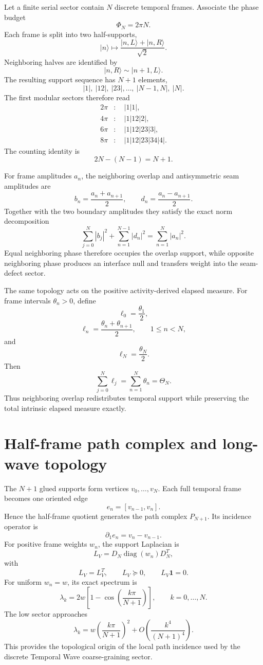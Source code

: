 \documentclass[11pt]{book}
\begin{document}
Let a finite serial sector contain $N$ discrete temporal frames. Associate the phase budget
\[
\boxed{\Phi_N=2\pi N.}
\]
Each frame is split into two half-supports,
\[
\boxed{
|n\rangle
\mapsto
\frac{|n,L\rangle+|n,R\rangle}{\sqrt2}.
}
\]
Neighboring halves are identified by
\[
\boxed{|n,R\rangle\sim|n+1,L\rangle.}
\]
The resulting support sequence has $N+1$ elements,
\[
\boxed{
|1|,\ |12|,\ |23|,\ldots,\ |N-1,N|,\ |N|.
}
\]
The first modular sectors therefore read
\[
\begin{aligned}
2\pi &: \quad |1|1|,\\
4\pi &: \quad |1|12|2|,\\
6\pi &: \quad |1|12|23|3|,\\
8\pi &: \quad |1|12|23|34|4|.
\end{aligned}
\]
The counting identity is
\[
\boxed{2N-(N-1)=N+1.}
\]

For frame amplitudes $a_n$, the neighboring overlap and antisymmetric seam amplitudes are
\[
\boxed{
b_n=\frac{a_n+a_{n+1}}2,
\qquad
d_n=\frac{a_n-a_{n+1}}2.
}
\]
Together with the two boundary amplitudes they satisfy the exact norm decomposition
\[
\boxed{
\sum_{j=0}^{N}|b_j|^2
+\sum_{n=1}^{N-1}|d_n|^2
=\sum_{n=1}^{N}|a_n|^2.
}
\]
Equal neighboring phase therefore occupies the overlap support, while opposite neighboring phase produces an interface null and transfers weight into the seam-defect sector.

The same topology acts on the positive activity-derived elapsed measure. For frame intervals $\theta_n>0$, define
\[
\boxed{\ell_0=\frac{\theta_1}{2},}
\]
\[
\boxed{\ell_n=\frac{\theta_n+\theta_{n+1}}2,
\qquad 1\le n<N,}
\]
and
\[
\boxed{\ell_N=\frac{\theta_N}{2}.}
\]
Then
\[
\boxed{
\sum_{j=0}^{N}\ell_j
=\sum_{n=1}^{N}\theta_n
=\Theta_N.
}
\]
Thus neighboring overlap redistributes temporal support while preserving the total intrinsic elapsed measure exactly.

\section{Half-frame path complex and long-wave topology}

The $N+1$ glued supports form vertices $v_0,\ldots,v_N$. Each full temporal frame becomes one oriented edge
\[
\boxed{e_n=[v_{n-1},v_n].}
\]
Hence the half-frame quotient generates the path complex $P_{N+1}$. Its incidence operator is
\[
\boxed{\partial_1 e_n=v_n-v_{n-1}.}
\]
For positive frame weights $w_n$, the support Laplacian is
\[
\boxed{
L_V=D_N\operatorname{diag}(w_n)D_N^T,
}
\]
with
\[
L_V=L_V^T,
\qquad
L_V\succeq0,
\qquad
L_V\mathbf1=0.
\]
For uniform $w_n=w$, its exact spectrum is
\[
\boxed{
\lambda_k
=2w\left[1-\cos\left(\frac{k\pi}{N+1}\right)\right],
\qquad k=0,\ldots,N.
}
\]
The low sector approaches
\[
\boxed{
\lambda_k
=w\left(\frac{k\pi}{N+1}\right)^2
+O\!\left(\frac{k^4}{(N+1)^4}\right).
}
\]
This provides the topological origin of the local path incidence used by the discrete Temporal Wave coarse-graining sector.
\end{document}
